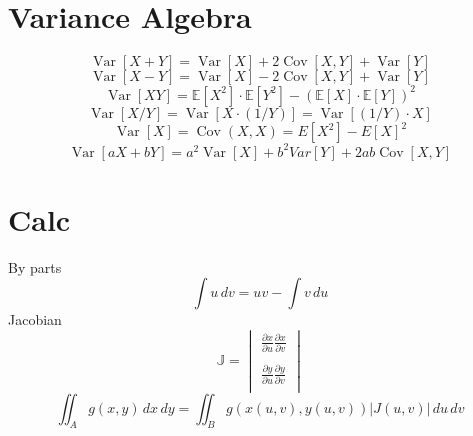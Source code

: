 \documentclass[twocolumn]{amsart}
\newcommand{\E}{\mathbb{E}}
\newcommand{\Cov}{\operatorname{Cov}}
\newcommand{\Var}{\operatorname{Var}}
\begin{document}
\section*{Variance Algebra}
\begin{equation*}
  \Var[X + Y] = \Var[X] + 2\Cov[X, Y] + \Var[Y]
\end{equation*}
\begin{equation*}
  \Var[X - Y] = \Var[X] - 2\Cov[X, Y] + \Var[Y]
\end{equation*}
\begin{equation*}
  \Var[XY] = \E[X^2] \cdot \E[Y^2] - {(\E[X] \cdot \E[Y])}^2
\end{equation*}
\begin{equation*}
  \Var[X/Y] = \Var[X \cdot (1/Y)] = \Var[(1/Y) \cdot X]
\end{equation*}
\begin{equation*}
  \Var[X] = \Cov(X, X) = E[X^2] - {E[X]}^2
\end{equation*}
\begin{equation*}
  \Var[aX+bY] = a^2\Var[X] + b^2 Var[Y] + 2ab\Cov[X,Y]
\end{equation*}

\section*{Calc}
By parts
\begin{equation*}
  \int u\,dv = uv-\int v\,du
\end{equation*}
Jacobian
\begin{equation*}
\mathbb{J}=\begin{vmatrix}
\frac{\partial x}{\partial u}\frac{\partial x}{\partial v} \\
\\
\frac{\partial y}{\partial u}\frac{\partial y}{\partial v} \\
\end{vmatrix}
\end{equation*}
\begin{equation*}
  \iint_{A}g(x,y)\,dx\,dy = \iint_{B}g(x(u,v),y(u,v))|J(u,v)|\,du\,dv
\end{equation*}
\end{document}
